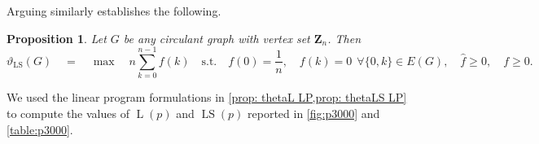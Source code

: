 \documentclass[]{spie}  %
\newtheorem{prop}[thm]{Proposition}
\begin{document}
Arguing similarly establishes the following.

\begin{prop}\label{prop: thetaLS LP}
Let $G$ be any circulant graph with vertex set $\mathbf{Z}_n$.  Then
\begin{equation}
\label{eq:thetaLSLP}
\vartheta_{\operatorname{LS}}(G) 
\quad
=
\quad
\operatorname{max}
\quad
n \displaystyle \sum_{k = 0}^{n - 1} f(k)
\quad
\text{s.t.}
\quad
f(0) = \frac{1}{n},
\quad
f(k) = 0~~\forall\{0,k\}\in E(G),
\quad
\widehat{f} \geq 0,
\quad
f \geq 0.
\end{equation}
\end{prop}

We used the linear program formulations in \cref{prop: thetaL LP,prop: thetaLS LP} to compute the values of $\operatorname{L}(p)$ and $\operatorname{LS}(p)$ reported in \cref{fig:p3000} and \cref{table:p3000}.
\end{document}
